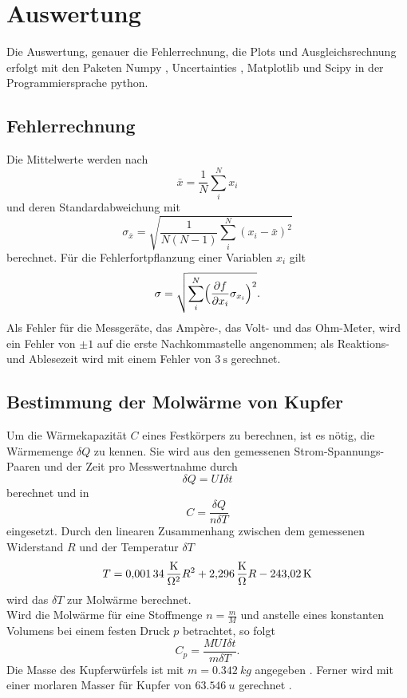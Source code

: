 \section{Auswertung}
Die Auswertung, genauer die Fehlerrechnung, die Plots und Ausgleichsrechnung erfolgt mit den Paketen
Numpy \cite{numpy}, Uncertainties \cite{uncertainties}, Matplotlib \cite{matplotlib} und Scipy \cite{scipy} in der Programmiersprache python.
\subsection{Fehlerrechnung}
Die Mittelwerte werden nach
\begin{equation}
	\bar{x}=\frac{1}{N}\sum_{i}^N x_i
\end{equation}
und deren Standardabweichung mit
\begin{equation}
	\sigma_{\bar{x}} = \sqrt{\frac{1}{N(N-1)} \sum_{i}^N (x_i-\bar{x})^2}
\end{equation}
berechnet.
Für die Fehlerfortpflanzung einer Variablen $x_i$ gilt
\begin{equation}
	\sigma = \sqrt{\sum_{i}^N \Bigl(\frac{\partial f}{\partial x_i} \sigma_{x_i}\Bigr)^2}.
	\label{eq:gaussfehler}
\end{equation}
Als Fehler für die Messgeräte, das Amp\`{e}re-, das Volt- und das Ohm-Meter, wird ein Fehler von $\pm 1$ auf die erste Nachkommastelle angenommen;
als Reaktions- und Ablesezeit wird mit einem Fehler von $\SI{3}{\second}$ gerechnet.

\subsection{Bestimmung der Molwärme von Kupfer}

Um die Wärmekapazität $C$ eines Festkörpers zu berechnen, ist es nötig, die Wärmemenge $\delta Q$ zu kennen.
Sie wird aus den gemessenen Strom-Spannungs-Paaren und der Zeit pro Messwertnahme durch
\begin{equation}
  \delta Q = U I \delta t
\end{equation}
berechnet und in
\begin{equation}
  C=\frac{\delta Q}{n\delta T}
\end{equation}
eingesetzt.
Durch den linearen Zusammenhang zwischen dem gemessenen Widerstand $R$ und der Temperatur $\delta T$
\begin{equation}
  T=\SI{0,00134}{\frac{K}{\ohm^2}} R^2 + \SI{2,296}{\frac{K}{\ohm}} R - \SI{243,02}{K}
\end{equation}
wird das $\delta T$ zur Molwärme berechnet.\\
Wird die Molwärme für eine Stoffmenge $n= \frac{m}{M}$ und anstelle eines konstanten Volumens bei einem festen Druck $p$ betrachtet,
so folgt
\begin{equation}
  C_p=\frac{MUI\delta t}{m\delta T}.
\end{equation}
Die Masse des Kupferwürfels ist mit $m=\SI{0,342}{kg}$ angegeben \cite{anleitung}.
Ferner wird mit einer morlaren Masser für Kupfer von $\SI{63,546}{u}$ gerechnet \cite{molaremassecu}.\\

